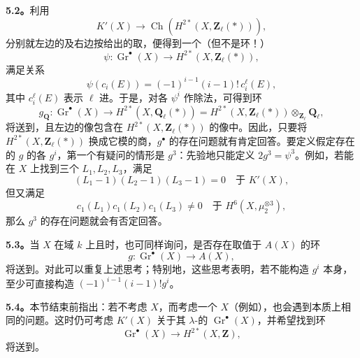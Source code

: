 \textbf{5.2。}利用 
\[K'(X)\longrightarrow\operatorname{Ch}(H^{2*}(X,\mathbf Z_\ell(*))),\]
分别就左边的及右边按给出的取，便得到一个（但不是环！）
\[\psi:\operatorname{Gr}^\bullet(X)\longrightarrow H^{2*}(X,\mathbf Z_\ell(*)),\]
满足关系
\[\psi(c_i(E))=(-1)^{i-1}(i-1)!\,c_i^\ell(E),\]
其中 $c_i^\ell(E)$ 表示 $\ell$ 进。于是，对各 $\psi^i$ 作除法，可得到环
\[g_{\mathbf Q}:\operatorname{Gr}^\bullet(X)\longrightarrow
H^{2*}(X,\mathbf Q_\ell(*))
=H^{2*}(X,\mathbf Z_\ell(*))\otimes_{\mathbf Z_\ell}\mathbf Q_\ell,\]
将送到，且左边的像包含在 $H^{2*}(X,\mathbf Z_\ell(*))$ 的像中。因此，只要将 $H^{2*}(X,\mathbf Z_\ell(*))$ 换成它模的商，$g^\bullet$ 的存在问题就有肯定回答。要定义假定存在的 $g$ 的各 $g^i$，第一个有疑问的情形是 $g^3$：先验地只能定义 $2g^3=\psi^3$。例如，若能在 $X$ 上找到三个 $L_1,L_2,L_3$，满足
\[(L_1-1)(L_2-1)(L_3-1)=0\quad\text{于 }K'(X),\]
但又满足
\[c_1(L_1)c_1(L_2)c_1(L_3)\ne0
\quad\text{于 }H^6(X,\mu_2^{\otimes3}),\]
那么 $g^3$ 的存在问题就会有否定回答。

\textbf{5.3。}当 $X$ 在域 $k$ 上且时，也可同样询问，是否存在取值于  $A(X)$ 的环
\[g:\operatorname{Gr}^\bullet(X)\longrightarrow A(X),\]
将送到。对此可以重复上述思考；特别地，这些思考表明，若不能构造 $g^i$ 本身，至少可直接构造 $(-1)^{i-1}(i-1)!g^i$。

\textbf{5.4。}本节结束前指出：若不考虑 $X$，而考虑一个 $X$（例如），也会遇到本质上相同的问题。这时仍可考虑 $K'(X)$ 关于其 $\lambda$-的 $\operatorname{Gr}^\bullet(X)$，并希望找到环
\[\operatorname{Gr}^\bullet(X)\longrightarrow H^{2*}(X,\mathbf Z),\]
将送到。

